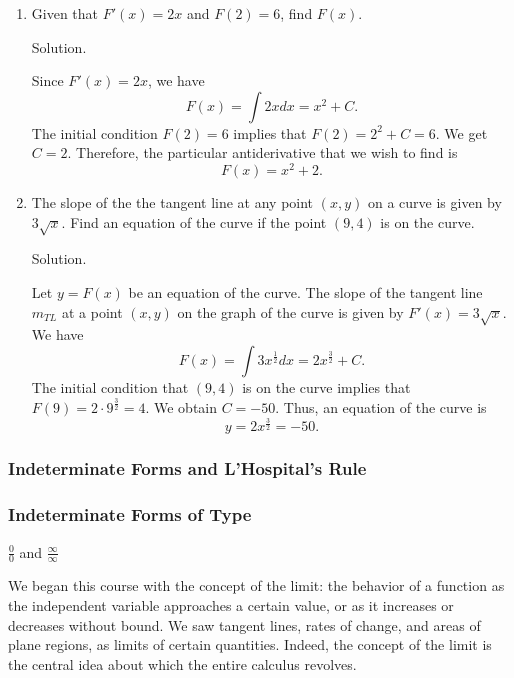 \documentclass[
  letterpaper,
  DIV=11,
  numbers=noendperiod]{scrartcl}
\begin{document}
\hypertarget{exm:particular_derivatives}{}
\begin{enumerate}
\def\labelenumi{\arabic{enumi}.}
\item
  Given that \(F'(x)=2x\) and \(F(2)=6\), find \(F(x)\).

  Solution.

  Since \(F'(x)=2x\), we have \[
  F(x)=\int 2xdx=x^2+C.
  \]The initial condition \(F(2)=6\) implies that \(F(2)=2^2+C=6\). We
  get \(C=2\). Therefore, the particular antiderivative that we wish to
  find is \[
  F(x)=x^2+2.
  \]
\item
  The slope of the the tangent line at any point \((x,y)\) on a curve is
  given by \(3\sqrt x\). Find an equation of the curve if the point
  \((9,4)\) is on the curve.

  Solution.

  Let \(y=F(x)\) be an equation of the curve. The slope of the tangent
  line \(m_{TL}\) at a point \((x,y)\) on the graph of the curve is
  given by \(F'(x)=3\sqrt x\). We have \[
  F(x)=\int 3x^\frac{1}{2}dx=2x^\frac{3}{2}+C.
  \] The initial condition that \((9,4)\) is on the curve implies that
  \(F(9)=2\cdot 9^\frac{3}{2}=4\). We obtain \(C=-50\). Thus, an
  equation of the curve is \[
  y=2x^\frac{3}{2}=-50.
  \]
\end{enumerate}

\hypertarget{indeterminate-forms-and-lhospitals-rule}{%
\subsubsection{Indeterminate Forms and L'Hospital's
Rule}\label{indeterminate-forms-and-lhospitals-rule}}

\hypertarget{htm:Indeterminateforms}{}
\hypertarget{indeterminate-forms-of-type}{%
\subsubsection{Indeterminate Forms of
Type}\label{indeterminate-forms-of-type}}

\(\frac{0}{0}\) and \(\frac{\infty}{\infty}\)

We began this course with the concept of the limit: the behavior of a
function as the independent variable approaches a certain value, or as
it increases or decreases without bound. We saw tangent lines, rates of
change, and areas of plane regions, as limits of certain quantities.
Indeed, the concept of the limit is the central idea about which the
entire calculus revolves.
\end{document}
